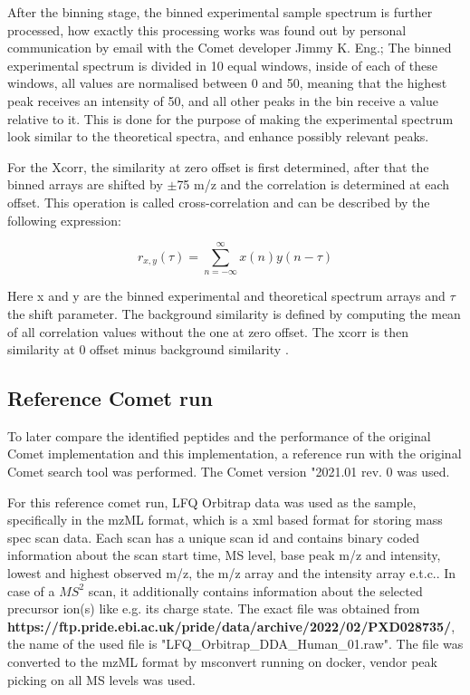 \documentclass[11pt]{article}
\begin{document}
After the binning stage, the binned experimental sample spectrum is further processed, how exactly this processing works was found out by personal communication by email with the Comet developer Jimmy K. Eng.; The binned experimental spectrum is divided in 10 equal windows, inside of each of these windows, all values are normalised between 0 and 50, meaning that the highest peak receives an intensity of 50, and all other peaks in the bin receive a value relative to it. This is done for the purpose of making the experimental spectrum look similar to the theoretical spectra, and enhance possibly relevant peaks.

For the Xcorr, the similarity at zero offset is first determined, after that the binned arrays are shifted by $\pm$75 m/z and the correlation is determined at each offset. This operation is called cross-correlation and can be described by the following expression:

\[r_{x,y}(\tau)=\displaystyle\sum_{n=-\infty}^{\infty}x(n)y(n-\tau)\]

Here x and y are the binned experimental and theoretical spectrum arrays and \(\tau\) the shift parameter.
The background similarity is defined by computing the mean of all correlation values without the one at zero offset. The xcorr is then similarity at 0 offset minus background similarity \cite{xcorr-function}.



\subsection{Reference Comet run}
To later compare the identified peptides and the performance of the original Comet implementation and this implementation, a reference run with the original Comet search tool was performed. The Comet version "2021.01 rev. 0 was used. 

 For this reference comet run, LFQ Orbitrap data was used as the sample, specifically in the mzML format, which is a xml based format for storing mass spec scan data. Each scan has a unique scan id and contains binary coded information about the scan start time, MS level, base peak m/z and intensity, lowest and highest observed m/z, the m/z array and the intensity array e.t.c.. In case of a \(MS^2\) scan, it additionally contains information about the selected precursor ion(s) like e.g. its charge state. The exact file was obtained from \textbf{https://ftp.pride.ebi.ac.uk/pride/data/archive/2022/02/PXD028735/}, the name of the used file is "LFQ\_Orbitrap\_DDA\_Human\_01.raw". The file was converted to the mzML format by msconvert running on docker, vendor peak picking on all MS levels was used.
\end{document}
